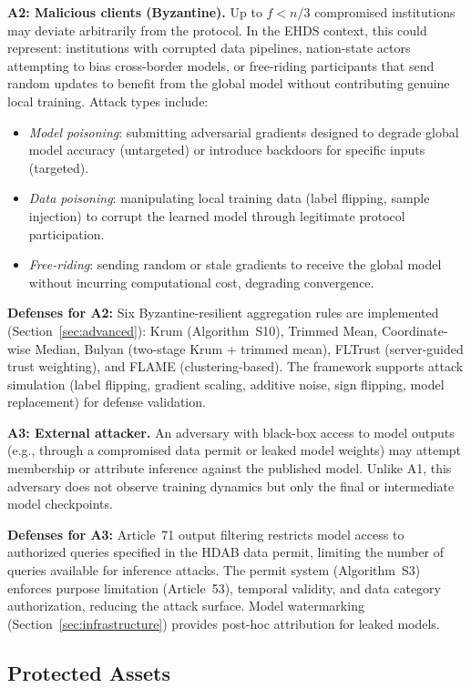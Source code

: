 \documentclass[conference,a4paper]{IEEEtran}
\begin{document}
\textbf{A2: Malicious clients (Byzantine).} Up to $f < n/3$ compromised institutions may deviate arbitrarily from the protocol. In the EHDS context, this could represent: institutions with corrupted data pipelines, nation-state actors attempting to bias cross-border models, or free-riding participants that send random updates to benefit from the global model without contributing genuine local training. Attack types include:
\begin{itemize}
    \item \textit{Model poisoning}: submitting adversarial gradients designed to degrade global model accuracy (untargeted) or introduce backdoors for specific inputs (targeted).
    \item \textit{Data poisoning}: manipulating local training data (label flipping, sample injection) to corrupt the learned model through legitimate protocol participation.
    \item \textit{Free-riding}: sending random or stale gradients to receive the global model without incurring computational cost, degrading convergence.
\end{itemize}

\textbf{Defenses for A2:} Six Byzantine-resilient aggregation rules are implemented (Section~\ref{sec:advanced}): Krum (Algorithm~S10), Trimmed Mean, Coordinate-wise Median, Bulyan (two-stage Krum + trimmed mean), FLTrust (server-guided trust weighting), and FLAME (clustering-based). The framework supports attack simulation (label flipping, gradient scaling, additive noise, sign flipping, model replacement) for defense validation.

\textbf{A3: External attacker.} An adversary with black-box access to model outputs (e.g., through a compromised data permit or leaked model weights) may attempt membership or attribute inference against the published model. Unlike A1, this adversary does not observe training dynamics but only the final or intermediate model checkpoints.

\textbf{Defenses for A3:} Article~71 output filtering restricts model access to authorized queries specified in the HDAB data permit, limiting the number of queries available for inference attacks. The permit system (Algorithm~S3) enforces purpose limitation (Article~53), temporal validity, and data category authorization, reducing the attack surface. Model watermarking (Section~\ref{sec:infrastructure}) provides post-hoc attribution for leaked models.

\subsection{Protected Assets}
\end{document}
